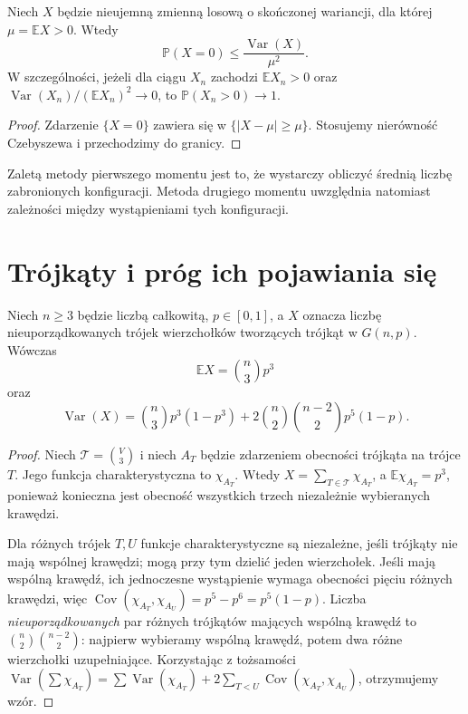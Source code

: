 \begin{lemat}
\label{lem:tg-random-second-moment}
Niech $X$ będzie nieujemną
zmienną losową o skończonej
wariancji, dla której
$\mu=\mathbb EX>0$.
Wtedy
\[
\mathbb P(X=0)
\leq\frac{\operatorname{Var}(X)}{\mu^2}.
\]
W szczególności, jeżeli
dla ciągu $X_n$ zachodzi
$\mathbb EX_n>0$ oraz
$\operatorname{Var}(X_n)/
(\mathbb EX_n)^2\to0$,
to $\mathbb P(X_n>0)\to1$.
\end{lemat}
\begin{proof}
Zdarzenie $\{X=0\}$ zawiera
się w $\{|X-\mu|\geq\mu\}$.
Stosujemy nierówność Czebyszewa
i przechodzimy do granicy.
\end{proof}

Zaletą metody pierwszego
momentu jest to, że
wystarczy obliczyć
średnią liczbę
zabronionych konfiguracji.
Metoda drugiego momentu
uwzględnia natomiast
zależności między
wystąpieniami tych
konfiguracji.

\section{Trójkąty i próg ich pojawiania się}
\label{sec:tg-random-triangles}

\begin{stwierdzenie}
\label{prop:tg-random-triangle-moments}
Niech $n\geq3$ będzie liczbą całkowitą, $p\in[0,1]$,
a $X$ oznacza liczbę
nieuporządkowanych trójek
wierzchołków tworzących
trójkąt w $G(n,p)$.
Wówczas
\[
\mathbb EX=\binom n3p^3
\]
oraz
\[
\operatorname{Var}(X)
=\binom n3p^3(1-p^3)
+2\binom n2\binom{n-2}2p^5(1-p).
\]
\end{stwierdzenie}
\begin{proof}
Niech $\mathcal T=\binom V3$
i niech $A_T$ będzie zdarzeniem obecności trójkąta
na trójce $T$. Jego funkcja charakterystyczna to $\chi_{A_T}$.
Wtedy $X=\sum_{T\in\mathcal T}\chi_{A_T}$,
a $\mathbb E\chi_{A_T}=p^3$,
ponieważ konieczna jest
obecność wszystkich
trzech niezależnie
wybieranych krawędzi.

Dla różnych trójek $T,U$
funkcje charakterystyczne są niezależne,
jeśli trójkąty
nie mają wspólnej krawędzi;
mogą przy tym dzielić
jeden wierzchołek.
Jeśli mają wspólną
krawędź, ich jednoczesne wystąpienie
wymaga obecności pięciu
różnych krawędzi, więc
$\operatorname{Cov}(\chi_{A_T},\chi_{A_U})
=p^5-p^6=p^5(1-p)$.
Liczba \emph{nieuporządkowanych}
par różnych trójkątów
mających wspólną
krawędź to
$\binom n2\binom{n-2}2$:
najpierw wybieramy
wspólną krawędź,
potem dwa różne
wierzchołki uzupełniające.
Korzystając z tożsamości
$\operatorname{Var}(\sum \chi_{A_T})
=\sum\operatorname{Var}(\chi_{A_T})
+2\sum_{T<U}\operatorname{Cov}(\chi_{A_T},\chi_{A_U})$,
otrzymujemy wzór.
\end{proof}

